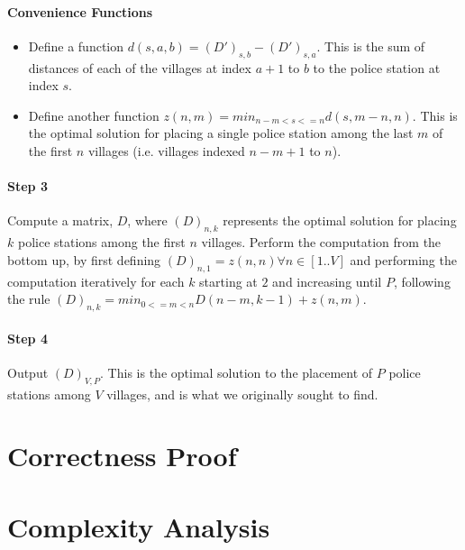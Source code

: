 \documentclass[]{article}
\begin{document}
		\paragraph{Convenience Functions}
		\begin{itemize}
			\item Define a function $d(s, a, b) = (D')_{s, b} - (D')_{s, a}$. This is the sum of distances of each of the villages at index $a+1$ to $b$ to the police station at index $s$.
			\item Define another function $z(n, m) = min_{n-m < s <= n}{d(s, m-n, n)}$. This is the optimal solution for placing a single police station among the last $m$ of the first $n$ villages (i.e. villages indexed $n-m+1$ to $n$).
		\end{itemize}
		
		\paragraph{Step 3}
		Compute a matrix, $D$, where $(D)_{n, k}$ represents the optimal solution for placing $k$ police stations among the first $n$ villages. Perform the computation from the bottom up, by first defining $(D)_{n, 1} = z(n, n) \forall n \in [1..V]$ and performing the computation iteratively for each $k$ starting at $2$ and increasing until $P$, following the rule $(D)_{n, k} = min_{0 <= m < n}{D(n-m, k-1) + z(n, m)}$.
		
		\paragraph{Step 4}
		Output $(D)_{V, P}$. This is the optimal solution to the placement of $P$ police stations among $V$ villages, and is what we originally sought to find.
			
	
	\section{Correctness Proof}
	
	\section{Complexity Analysis}
	
	
\end{document}
